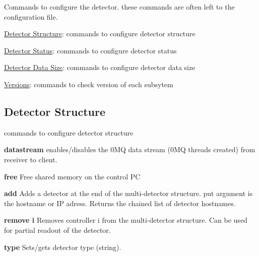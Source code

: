 Commands to configure the detector. these commands are often left to the configuration file.
\begin{DoxyItemize}
\item \hyperlink{config_detstructure}{Detector Structure}: commands to configure detector structure
\item \hyperlink{config_detstatus}{Detector Status}: commands to configure detector status
\item \hyperlink{config_detsize}{Detector Data Size}: commands to configure detector data size
\item \hyperlink{config_versions}{Versions}: commands to check version of each subsytem
\end{DoxyItemize}\hypertarget{config_detstructure}{}\subsection{Detector Structure}\label{config_detstructure}
commands to configure detector structure


\begin{DoxyItemize}
\item {\bfseries datastream} enables/disables the 0MQ data stream (0MQ threads created) from receiver to client.
\end{DoxyItemize}


\begin{DoxyItemize}
\item {\bfseries free} Free shared memory on the control PC
\end{DoxyItemize}


\begin{DoxyItemize}
\item {\bfseries add} Adds a detector at the end of the multi-\/detector structure. {\ttfamily put} argument is the hostname or IP adress. Returns the chained list of detector hostnames.
\end{DoxyItemize}


\begin{DoxyItemize}
\item {\bfseries remove i} Removes controller {\ttfamily i} from the multi-\/detector structure. Can be used for partial readout of the detector.
\end{DoxyItemize}


\begin{DoxyItemize}
\item {\bfseries type} Sets/gets detector type (string).
\end{DoxyItemize}


